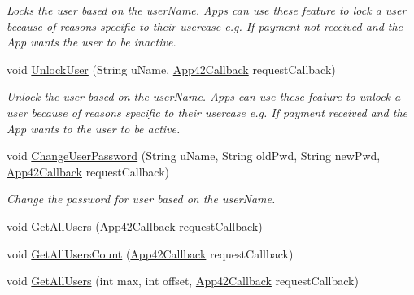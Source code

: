 \begin{DoxyCompactItemize}
\begin{DoxyCompactList}\small\item\em Locks the user based on the user\+Name. Apps can use these feature to lock a user because of reasons specific to their usercase e.\+g. If payment not received and the App wants the user to be inactive. \end{DoxyCompactList}\item 
void \hyperlink{classcom_1_1shephertz_1_1app42_1_1paas_1_1sdk_1_1windows_1_1user_1_1_user_service_a2d07241e30e2518246ec122597209e50}{Unlock\+User} (String u\+Name, \hyperlink{interfacecom_1_1shephertz_1_1app42_1_1paas_1_1sdk_1_1windows_1_1_app42_callback}{App42\+Callback} request\+Callback)
\begin{DoxyCompactList}\small\item\em Unlock the user based on the user\+Name. Apps can use these feature to unlock a user because of reasons specific to their usercase e.\+g. If payment received and the App wants to the user to be active. \end{DoxyCompactList}\item 
void \hyperlink{classcom_1_1shephertz_1_1app42_1_1paas_1_1sdk_1_1windows_1_1user_1_1_user_service_a1d8879644410f4951bed7658c8074871}{Change\+User\+Password} (String u\+Name, String old\+Pwd, String new\+Pwd, \hyperlink{interfacecom_1_1shephertz_1_1app42_1_1paas_1_1sdk_1_1windows_1_1_app42_callback}{App42\+Callback} request\+Callback)
\begin{DoxyCompactList}\small\item\em Change the password for user based on the user\+Name. \end{DoxyCompactList}\item 
void \hyperlink{classcom_1_1shephertz_1_1app42_1_1paas_1_1sdk_1_1windows_1_1user_1_1_user_service_a4c0e2e137d0915f18c44f4e3673664ee}{Get\+All\+Users} (\hyperlink{interfacecom_1_1shephertz_1_1app42_1_1paas_1_1sdk_1_1windows_1_1_app42_callback}{App42\+Callback} request\+Callback)
\item 
void \hyperlink{classcom_1_1shephertz_1_1app42_1_1paas_1_1sdk_1_1windows_1_1user_1_1_user_service_a2ad375a7eac73e919fffffac797f06d2}{Get\+All\+Users\+Count} (\hyperlink{interfacecom_1_1shephertz_1_1app42_1_1paas_1_1sdk_1_1windows_1_1_app42_callback}{App42\+Callback} request\+Callback)
\item 
void \hyperlink{classcom_1_1shephertz_1_1app42_1_1paas_1_1sdk_1_1windows_1_1user_1_1_user_service_a7f9aec14978719de29bb7b1c3557d43f}{Get\+All\+Users} (int max, int offset, \hyperlink{interfacecom_1_1shephertz_1_1app42_1_1paas_1_1sdk_1_1windows_1_1_app42_callback}{App42\+Callback} request\+Callback)

\end{DoxyCompactItemize}

